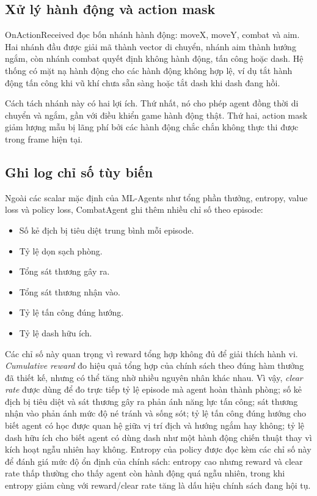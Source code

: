 \subsection{Xử lý hành động và action mask}

OnActionReceived đọc bốn nhánh hành động: moveX, moveY, combat và aim. Hai nhánh đầu được giải mã thành vector di chuyển, nhánh aim thành hướng ngắm, còn nhánh combat quyết định không hành động, tấn công hoặc dash. Hệ thống có mặt nạ hành động cho các hành động không hợp lệ, ví dụ tắt hành động tấn công khi vũ khí chưa sẵn sàng hoặc tắt dash khi dash đang hồi.

Cách tách nhánh này có hai lợi ích. Thứ nhất, nó cho phép agent đồng thời di chuyển và ngắm, gần với điều khiển game hành động thật. Thứ hai, action mask giảm lượng mẫu bị lãng phí bởi các hành động chắc chắn không thực thi được trong frame hiện tại.

\subsection{Ghi log chỉ số tùy biến}

Ngoài các scalar mặc định của ML-Agents như tổng phần thưởng, entropy, value loss và policy loss, CombatAgent ghi thêm nhiều chỉ số theo episode:

\begin{itemize}
    \item Số kẻ địch bị tiêu diệt trung bình mỗi episode.
    \item Tỷ lệ dọn sạch phòng.
    \item Tổng sát thương gây ra.
    \item Tổng sát thương nhận vào.
    \item Tỷ lệ tấn công đúng hướng.
    \item Tỷ lệ dash hữu ích.
\end{itemize}

Các chỉ số này quan trọng vì reward tổng hợp không đủ để giải thích hành vi. \textit{Cumulative reward} đo hiệu quả tổng hợp của chính sách theo đúng hàm thưởng đã thiết kế, nhưng có thể tăng nhờ nhiều nguyên nhân khác nhau. Vì vậy, \textit{clear rate} được dùng để đo trực tiếp tỷ lệ episode mà agent hoàn thành phòng; số kẻ địch bị tiêu diệt và sát thương gây ra phản ánh năng lực tấn công; sát thương nhận vào phản ánh mức độ né tránh và sống sót; tỷ lệ tấn công đúng hướng cho biết agent có học được quan hệ giữa vị trí địch và hướng ngắm hay không; tỷ lệ dash hữu ích cho biết agent có dùng dash như một hành động chiến thuật thay vì kích hoạt ngẫu nhiên hay không. Entropy của policy được đọc kèm các chỉ số này để đánh giá mức độ ổn định của chính sách: entropy cao nhưng reward và clear rate thấp thường cho thấy agent còn hành động quá ngẫu nhiên, trong khi entropy giảm cùng với reward/clear rate tăng là dấu hiệu chính sách đang hội tụ.

